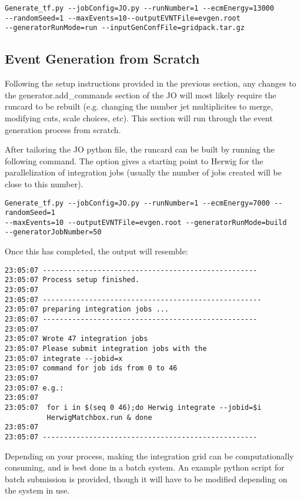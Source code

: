 \begin{verbatim}
Generate_tf.py --jobConfig=JO.py --runNumber=1 --ecmEnergy=13000 
--randomSeed=1 --maxEvents=10--outputEVNTFile=evgen.root 
--generatorRunMode=run --inputGenConfFile=gridpack.tar.gz
\end{verbatim}

\subsection{Event Generation from Scratch}

Following the setup instructions provided in the previous section, any changes to the generator.add\_commands section of the JO will most likely require the runcard to be rebuilt (e.g. changing the number jet multiplicites to merge, modifying cuts, scale choices, etc). This section will run through the event generation process from scratch.

After tailoring the JO python file, the runcard can be built by running the following command. The  option gives a starting point to Herwig for the parallelization of integration jobs (usually the number of jobs created will be close to this number). 

\begin{verbatim}
Generate_tf.py --jobConfig=JO.py --runNumber=1 --ecmEnergy=7000 --randomSeed=1 
--maxEvents=10 --outputEVNTFile=evgen.root --generatorRunMode=build 
--generatorJobNumber=50
\end{verbatim}

\noindent Once this has completed, the output will resemble:

\begin{verbatim}
23:05:07 ---------------------------------------------------
23:05:07 Process setup finished.
23:05:07 
23:05:07 ----------------------------------------------------
23:05:07 preparing integration jobs ...
23:05:07 ---------------------------------------------------
23:05:07 
23:05:07 Wrote 47 integration jobs
23:05:07 Please submit integration jobs with the
23:05:07 integrate --jobid=x
23:05:07 command for job ids from 0 to 46
23:05:07 
23:05:07 e.g.:
23:05:07 
23:05:07  for i in $(seq 0 46);do Herwig integrate --jobid=$i 
          HerwigMatchbox.run & done
23:05:07 
23:05:07 ---------------------------------------------------
\end{verbatim}

Depending on your process, making the integration grid can be computationally consuming, and is best done in a batch system. An example python script for batch submission is provided, though it will have to be modified depending on the system in use. 

